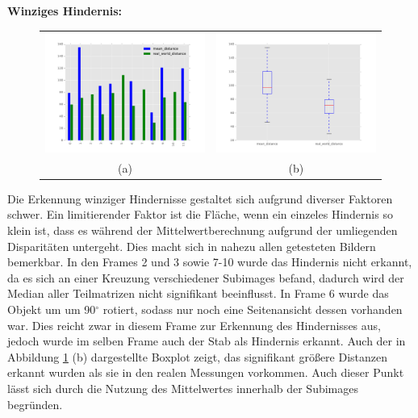 	\noindent
	\textbf{Winziges Hindernis:}\\
	\begin{figure}[h]
		\centering
		\begin{tabular}{cc}
		\includegraphics[width=7cm]{img/evaluation/sub_tiny_bar}&
		\includegraphics[width=7cm]{img/evaluation/sub_tiny_box}\\
		(a)	& (b)
		\end{tabular}
	    \caption{}
	    \label{fig:eval_tiny}
	\end{figure}
	
	\noindent
	Die Erkennung winziger Hindernisse gestaltet sich aufgrund diverser Faktoren schwer. Ein limitierender Faktor ist die Fläche, wenn ein einzeles Hindernis so klein ist, dass es während der Mittelwertberechnung aufgrund der umliegenden Disparitäten untergeht. Dies macht sich in nahezu allen getesteten Bildern bemerkbar. In den Frames 2 und 3 sowie 7-10 wurde das Hindernis nicht erkannt, da es sich an einer Kreuzung verschiedener Subimages befand, dadurch wird der Median aller Teilmatrizen nicht signifikant beeinflusst. In Frame 6 wurde das Objekt um um 90$^{\circ}$ rotiert, sodass nur noch eine Seitenansicht dessen vorhanden war. Dies reicht zwar in diesem Frame zur Erkennung des Hindernisses aus, jedoch wurde im selben Frame auch der Stab als Hindernis erkannt. Auch der in Abbildung \ref{fig:eval_tiny} (b) dargestellte Boxplot zeigt, das signifikant größere Distanzen erkannt wurden als sie in den realen Messungen vorkommen. Auch dieser Punkt lässt sich durch die Nutzung des Mittelwertes innerhalb der Subimages begründen.

